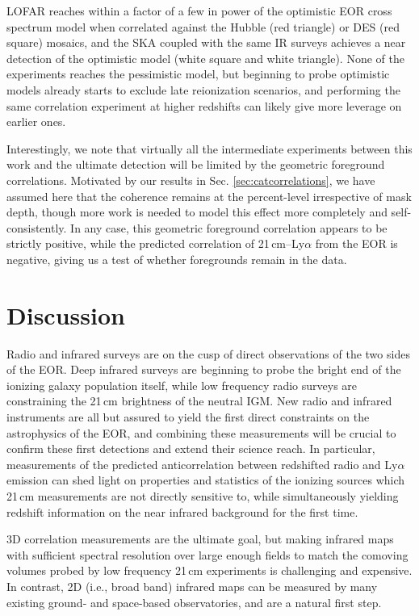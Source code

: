 \documentclass[numberedappendix]{emulateapj}
\begin{document}
LOFAR reaches within a factor of a few in power of the optimistic EOR cross spectrum model when correlated against the Hubble (red triangle) or DES (red square) mosaics, and the SKA coupled with the same IR surveys achieves a near detection of the optimistic model (white square and white triangle). None of the experiments reaches the pessimistic model, but beginning to probe optimistic models already starts to exclude late reionization scenarios, and performing the same correlation experiment at higher redshifts can likely give more leverage on earlier ones. 

Interestingly, we note that virtually all the intermediate experiments between this work and the ultimate detection will be limited by the geometric foreground correlations. Motivated by our results in Sec. \ref{sec:catcorrelations}, we have assumed here that the coherence remains at the percent-level irrespective of mask depth, though more work is needed to model this effect more completely and self-consistently. In any case, this geometric foreground correlation appears to be strictly positive, while the predicted correlation of 21\,cm--Ly$\alpha$ from the EOR is negative, giving us a test of whether foregrounds remain in the data.

\section{Discussion}

Radio and infrared surveys are on the cusp of direct observations of the two sides of the EOR. Deep infrared surveys are beginning to probe the bright end of the ionizing galaxy population itself, while low frequency radio surveys are constraining the 21\,cm brightness of the neutral IGM. New radio and infrared instruments are all but assured to yield the first direct constraints on the astrophysics of the EOR, and combining these measurements will be crucial to confirm these first detections and extend their science reach. In particular, measurements of the predicted anticorrelation between redshifted radio and Ly$\alpha$ emission can shed light on properties and statistics of the ionizing sources which 21\,cm measurements are not directly sensitive to, while simultaneously yielding redshift information on the near infrared background for the first time. 

3D correlation measurements are the ultimate goal, but making infrared maps with sufficient spectral resolution over large enough fields to match the comoving volumes probed by low frequency 21\,cm experiments is challenging and expensive. In contrast, 2D (i.e., broad band) infrared maps can be measured by many existing ground- and space-based observatories, and are a natural first step. 
\end{document}
